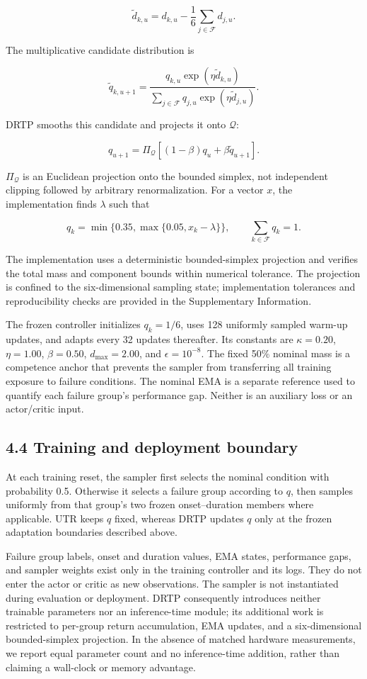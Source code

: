 \[
\tilde d_{k,u}=d_{k,u}-\frac{1}{6}\sum_{j\in\mathcal F}d_{j,u}.
\]

The multiplicative candidate distribution is

\[
\tilde q_{k,u+1}=
\frac{q_{k,u}\exp(\eta\tilde d_{k,u})}
{\sum_{j\in\mathcal F}q_{j,u}\exp(\eta\tilde d_{j,u})}.
\]

DRTP smooths this candidate and projects it onto \(\mathcal Q\):

\[
q_{u+1}=\Pi_{\mathcal Q}\left[(1-\beta)q_u+\beta\tilde q_{u+1}\right].
\]

\(\Pi_{\mathcal Q}\) is an Euclidean projection onto the bounded simplex, not independent clipping followed by arbitrary renormalization. For a vector \(x\), the implementation finds \(\lambda\) such that

\[
q_k=\min\{0.35,\max\{0.05,x_k-\lambda\}\},
\qquad \sum_{k\in\mathcal F}q_k=1.
\]

The implementation uses a deterministic bounded-simplex projection and verifies the total mass and component bounds within numerical tolerance. The projection is confined to the six-dimensional sampling state; implementation tolerances and reproducibility checks are provided in the Supplementary Information.

The frozen controller initializes \(q_k=1/6\), uses 128 uniformly sampled warm-up updates, and adapts every 32 updates thereafter. Its constants are \(\kappa=0.20\), \(\eta=1.00\), \(\beta=0.50\), \(d_{\max}=2.00\), and \(\epsilon=10^{-8}\). The fixed 50\% nominal mass is a competence anchor that prevents the sampler from transferring all training exposure to failure conditions. The nominal EMA is a separate reference used to quantify each failure group's performance gap. Neither is an auxiliary loss or an actor/critic input.

\subsection{4.4 Training and deployment boundary}

At each training reset, the sampler first selects the nominal condition with probability 0.5. Otherwise it selects a failure group according to \(q\), then samples uniformly from that group's two frozen onset--duration members where applicable. UTR keeps \(q\) fixed, whereas DRTP updates \(q\) only at the frozen adaptation boundaries described above.

Failure group labels, onset and duration values, EMA states, performance gaps, and sampler weights exist only in the training controller and its logs. They do not enter the actor or critic as new observations. The sampler is not instantiated during evaluation or deployment. DRTP consequently introduces neither trainable parameters nor an inference-time module; its additional work is restricted to per-group return accumulation, EMA updates, and a six-dimensional bounded-simplex projection. In the absence of matched hardware measurements, we report equal parameter count and no inference-time addition, rather than claiming a wall-clock or memory advantage.

